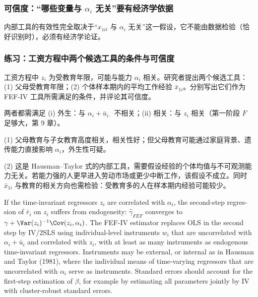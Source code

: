 \subsubsection{可信度：“哪些变量与 \texorpdfstring{$\alpha_i$}{alpha\_i} 无关”要有经济学依据}

内部工具的有效性完全取决于“$x_{1it}$ 与 $\alpha_i$ 无关”这一假设，它不能由数据检验（恰好识别时），必须有经济学论证。

\subsubsection{练习：工资方程中两个候选工具的条件与可信度}

\begin{prac}[工具变量的条件]\label{pr:U11b-iv}
工资方程中 $z_i$ 为受教育年限，可能与能力 $\alpha_i$ 相关。研究者提出两个候选工具：(1) 父母受教育年限；(2) 个体样本期内的平均工作经验 $\bar x_{1i}$。分别写出它们作为 FEF-IV 工具所需满足的条件，并评论其可信度。

\answer 两者都需满足 (i) 外生：与 $\alpha_i+\bar u_{i\cdot}$ 不相关；(ii) 相关：与 $z_i$ 相关（第一阶段 $F$ 足够大，第 9 章）。

(1) 父母教育与子女教育高度相关，相关性好；但父母教育可能通过家庭背景、遗传能力直接影响 $\alpha_i$，外生性可疑。

(2) 这是 Hausman--Taylor 式的内部工具，需要假设经验的个体均值与不可观测能力无关。若能力强的人更早进入劳动市场或更少中断工作，该假设不成立。同时 $\bar x_{1i}$ 与教育的相关方向也需检验：受教育多的人在样本期内经验可能较少。
\end{prac}

\begin{english}
If the time-invariant regressors $z_i$ are correlated with $\alpha_i$, the second-step regression of $\bar r_i$ on $z_i$ suffers from endogeneity: $\hat\gamma_{FEF}$ converges to $\gamma+\Var(z_i)^{-1}\Cov(z_i,\alpha_i)$. The FEF-IV estimator replaces OLS in the second step by IV/2SLS using individual-level instruments $w_i$ that are uncorrelated with $\alpha_i+\bar u_i$ and correlated with $z_i$, with at least as many instruments as endogenous time-invariant regressors. Instruments may be external, or internal as in Hausman and Taylor (1981), where the individual means of time-varying regressors that are uncorrelated with $\alpha_i$ serve as instruments. Standard errors should account for the first-step estimation of $\beta$, for example by estimating all parameters jointly by IV with cluster-robust standard errors.
\end{english}

